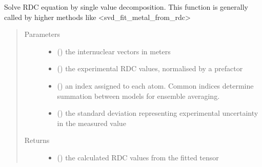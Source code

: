 \documentclass[a4paper,10pt,english,openany,oneside]{sphinxmanual}
\begin{document}
\begin{fulllineitems}
\label{\detokenize{reference/generated/paramagpy.fit.svd_calc_metal_from_rdc:paramagpy.fit.svd_calc_metal_from_rdc}}
\sphinxAtStartPar
Solve RDC equation by single value decomposition.
This function is generally called by higher methods like
\textless{}svd\_fit\_metal\_from\_rdc\textgreater{}
\begin{quote}\begin{description}
\item[{Parameters}] \leavevmode\begin{itemize}
\item {} 
\sphinxAtStartPar
{} (\sphinxstyleliteralemphasis{\sphinxupquote{ {[}}}\sphinxstyleliteralemphasis{\sphinxupquote{,}}\sphinxstyleliteralemphasis{\sphinxupquote{,}}\sphinxstyleliteralemphasis{\sphinxupquote{{]} }}) \textendash{} the internuclear vectors in meters

\item {} 
\sphinxAtStartPar
{} () \textendash{} the experimental RDC values, normalised by a prefactor

\item {} 
\sphinxAtStartPar
{} () \textendash{} an index assigned to each atom. Common indices determine summation
between models for ensemble averaging.

\item {} 
\sphinxAtStartPar
{} () \textendash{} the standard deviation representing experimental uncertainty
in the measured value

\end{itemize}

\item[{Returns}] \leavevmode
\sphinxAtStartPar
\begin{itemize}
\item {} 
\sphinxAtStartPar
{} () \textendash{} the calculated RDC values from the fitted tensor


\end{itemize}
\end{description}
\end{quote}
\end{fulllineitems}
\end{document}

